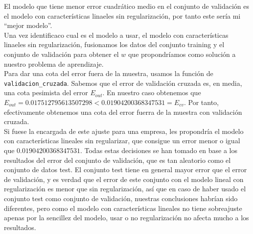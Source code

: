 \documentclass{article}
\begin{document}
El modelo que tiene menor error cuadrático medio en el conjunto de validación es el modelo con características linaeles sin regularización, por tanto este sería mi ``mejor modelo''.\\

Una vez identificaco cual es el modelo a usar, el modelo con características linaeles sin regularización, fusionamos los datos del conjunto training y el conjunto de validación para obtener el $w$ que propondríamos como solución a nuestro problema de aprendizaje.\\

Para dar una cota del error fuera de la muestra, usamos la función de \texttt{validacion\_cruzada}. Sabemos que el error de validación cruzada es, en media, una cota pesimista del error $E_{out}$. En nuestro caso obtenemos que $E_{out} = 0.017512795613507298 < 0.01904200368347531 = E_{cv}$. Por tanto, efectivamente obtenemos una cota del error fuerra de la muestra con validación cruzada.\\

Si fuese la encargada de este ajuste para una empresa, les propondría el modelo con características lineales sin regularizar, que consigue un error menor o igual que $0.01904200368347531$. Todas estas decisiones se han tomado en base a los resultados del error del conjunto de validación, que es tan aleatorio como el conjunto de datos test. El conjunto test tiene en general mayor error que el error de validación, y es verdad que el error de este conjunto con el modelo lineal con regularización es menor que sin regularización, así que en caso de haber usado el conjunto test como conjunto de validación, nuestras conclusiones habrían sido diferentes, pero como el modelo con características lineales no tiene sobreajuste apenas por la sencillez del modelo, usar o no regularización no afecta mucho a los resultados.
\end{document}
